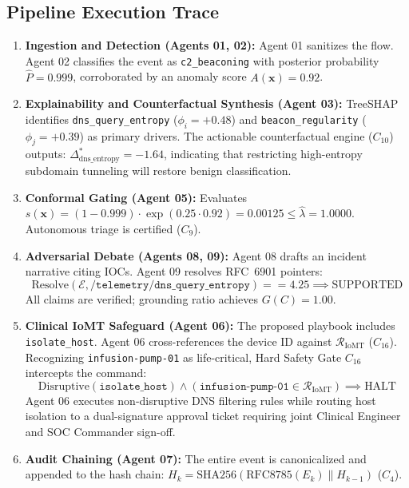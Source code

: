 \documentclass{ieeeaccess}
\begin{document}
\subsection{Pipeline Execution Trace}
\begin{enumerate}
    \item \textbf{Ingestion and Detection (Agents 01, 02):} Agent 01 sanitizes the flow. Agent 02 classifies the event as \texttt{c2\_beaconing} with posterior probability $\hat{P} = 0.999$, corroborated by an anomaly score $A(\mathbf{x}) = 0.92$.
    \item \textbf{Explainability and Counterfactual Synthesis (Agent 03):} TreeSHAP identifies \texttt{dns\_query\_entropy} ($\phi_i = +0.48$) and \texttt{beacon\_regularity} ($\phi_j = +0.39$) as primary drivers. The actionable counterfactual engine ($C_{10}$) outputs: $\Delta^*_{\text{dns\_entropy}} = -1.64$, indicating that restricting high-entropy subdomain tunneling will restore benign classification.
    \item \textbf{Conformal Gating (Agent 05):} Evaluates $s(\mathbf{x}) = (1 - 0.999) \cdot \exp(0.25 \cdot 0.92) = 0.00125 \le \hat{\lambda} = 1.0000$. Autonomous triage is certified ($C_9$).
    \item \textbf{Adversarial Debate (Agents 08, 09):} Agent 08 drafts an incident narrative citing IOCs. Agent 09 resolves RFC~6901 pointers:
    \begin{equation}
    \text{Resolve}(\mathcal{E}, \texttt{/telemetry/dns\_query\_entropy}) == 4.25 \implies \text{SUPPORTED}
    \end{equation}
    All claims are verified; grounding ratio achieves $G(C) = 1.00$.
    \item \textbf{Clinical IoMT Safeguard (Agent 06):} The proposed playbook includes \texttt{isolate\_host}. Agent 06 cross-references the device ID against $\mathcal{R}_{\text{IoMT}}$ ($C_{16}$). Recognizing \texttt{infusion-pump-01} as life-critical, Hard Safety Gate $C_{16}$ intercepts the command:
    \begin{equation}
    \text{Disruptive}(\texttt{isolate\_host}) \wedge (\texttt{infusion-pump-01} \in \mathcal{R}_{\text{IoMT}}) \implies \text{HALT}
    \end{equation}
    Agent 06 executes non-disruptive DNS filtering rules while routing host isolation to a dual-signature approval ticket requiring joint Clinical Engineer and SOC Commander sign-off.
    \item \textbf{Audit Chaining (Agent 07):} The entire event is canonicalized and appended to the hash chain: $H_k = \text{SHA256}(\text{RFC8785}(E_k) \parallel H_{k-1})$ ($C_4$).
\end{enumerate}
\end{document}
